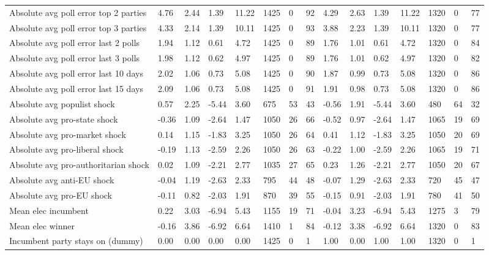 \begin{longtable}{lllllllllllllll}
Absolute avg poll error top 2 parties & 4.76 & 2.44 & 1.39 & 11.22 & 1425 & 0 & 92 & 4.29 & 2.63 & 1.39 & 11.22 & 1320 & 0 & 77\\
\addlinespace
Absolute avg poll error top 3 parties & 4.33 & 2.14 & 1.39 & 10.11 & 1425 & 0 & 93 & 3.88 & 2.23 & 1.39 & 10.11 & 1320 & 0 & 77\\
Absolute avg poll error last 2 polls & 1.94 & 1.12 & 0.61 & 4.72 & 1425 & 0 & 89 & 1.76 & 1.01 & 0.61 & 4.72 & 1320 & 0 & 84\\
Absolute avg poll error last 3 polls & 1.98 & 1.12 & 0.62 & 4.97 & 1425 & 0 & 89 & 1.76 & 1.01 & 0.62 & 4.97 & 1320 & 0 & 82\\
Absolute avg poll error last 10 days & 2.02 & 1.06 & 0.73 & 5.08 & 1425 & 0 & 90 & 1.87 & 0.99 & 0.73 & 5.08 & 1320 & 0 & 86\\
Absolute avg poll error last 15 days & 2.09 & 1.06 & 0.73 & 5.08 & 1425 & 0 & 91 & 1.91 & 0.98 & 0.73 & 5.08 & 1320 & 0 & 86\\
\addlinespace
Absolute avg populist shock & 0.57 & 2.25 & -5.44 & 3.60 & 675 & 53 & 43 & -0.56 & 1.91 & -5.44 & 3.60 & 480 & 64 & 32\\
Absolute avg pro-state shock & -0.36 & 1.09 & -2.64 & 1.47 & 1050 & 26 & 66 & -0.52 & 0.97 & -2.64 & 1.47 & 1065 & 19 & 69\\
Absolute avg pro-market shock & 0.14 & 1.15 & -1.83 & 3.25 & 1050 & 26 & 64 & 0.41 & 1.12 & -1.83 & 3.25 & 1050 & 20 & 69\\
Absolute avg pro-liberal shock & -0.19 & 1.13 & -2.59 & 2.26 & 1050 & 26 & 63 & -0.22 & 1.00 & -2.59 & 2.26 & 1065 & 19 & 71\\
Absolute avg pro-authoritarian shock & 0.02 & 1.09 & -2.21 & 2.77 & 1035 & 27 & 65 & 0.23 & 1.26 & -2.21 & 2.77 & 1050 & 20 & 67\\
\addlinespace
Absolute avg anti-EU shock & -0.04 & 1.19 & -2.63 & 2.33 & 795 & 44 & 48 & -0.07 & 1.29 & -2.63 & 2.33 & 720 & 45 & 47\\
Absolute avg pro-EU shock & -0.11 & 0.82 & -2.03 & 1.91 & 870 & 39 & 55 & -0.15 & 0.91 & -2.03 & 1.91 & 780 & 41 & 50\\
Mean elec incumbent & 0.22 & 3.03 & -6.94 & 5.43 & 1155 & 19 & 71 & -0.04 & 3.23 & -6.94 & 5.43 & 1275 & 3 & 79\\
Mean elec winner & -0.16 & 3.86 & -6.92 & 6.64 & 1410 & 1 & 84 & -0.12 & 3.38 & -6.92 & 6.64 & 1320 & 0 & 83\\
Incumbent party stays on (dummy) & 0.00 & 0.00 & 0.00 & 0.00 & 1425 & 0 & 1 & 1.00 & 0.00 & 1.00 & 1.00 & 1320 & 0 & 1\\

\end{longtable}
